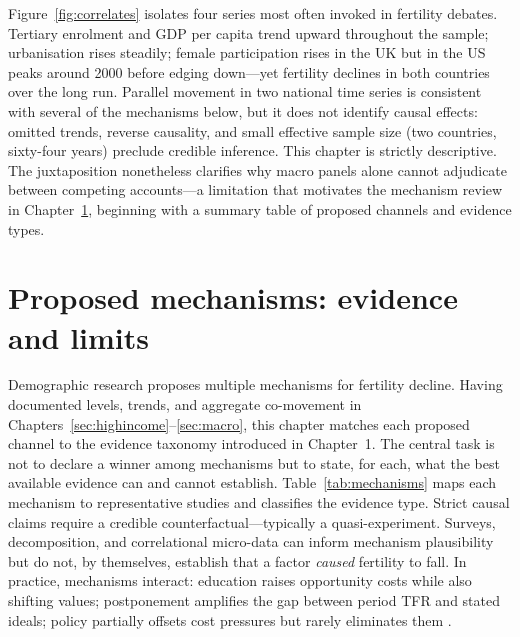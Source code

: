 \documentclass[11pt,a4paper,openany]{book}
\begin{document}
Figure~\ref{fig:correlates} isolates four series most often invoked in fertility debates. Tertiary enrolment and GDP per capita trend upward throughout the sample; urbanisation rises steadily; female participation rises in the UK but in the US peaks around 2000 before edging down---yet fertility declines in both countries over the long run. Parallel movement in two national time series is consistent with several of the mechanisms below, but it does not identify causal effects: omitted trends, reverse causality, and small effective sample size (two countries, sixty-four years) preclude credible inference. This chapter is strictly descriptive. The juxtaposition nonetheless clarifies why macro panels alone cannot adjudicate between competing accounts---a limitation that motivates the mechanism review in Chapter~\ref{sec:mechanisms}, beginning with a summary table of proposed channels and evidence types.

\FloatBarrier
\chapter{Proposed mechanisms: evidence and limits}
\label{sec:mechanisms}

Demographic research proposes multiple mechanisms for fertility decline. Having documented levels, trends, and aggregate co-movement in Chapters~\ref{sec:highincome}--\ref{sec:macro}, this chapter matches each proposed channel to the evidence taxonomy introduced in Chapter~1. The central task is not to declare a winner among mechanisms but to state, for each, what the best available evidence can and cannot establish. Table~\ref{tab:mechanisms} maps each mechanism to representative studies and classifies the evidence type. Strict causal claims require a credible counterfactual---typically a quasi-experiment. Surveys, decomposition, and correlational micro-data can inform mechanism plausibility but do not, by themselves, establish that a factor \emph{caused} fertility to fall. In practice, mechanisms interact: education raises opportunity costs while also shifting values; postponement amplifies the gap between period TFR and stated ideals; policy partially offsets cost pressures but rarely eliminates them \citep{doepke2023,sobotka2020}.
\end{document}
